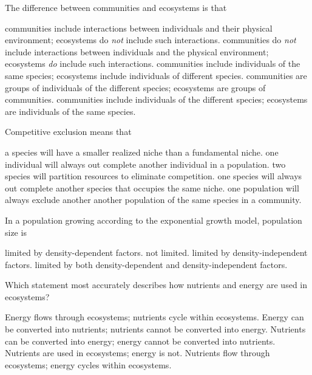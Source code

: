 \newpage

\question
The difference between communities and ecosystems is that

\begin{choices}
\choice communities include interactions between individuals and their physical environment; ecosystems do \emph{not} include such interactions.
\correctchoice communities do \emph{not} include interactions between individuals and the physical environment; ecosystems \emph{do} include such interactions.
\choice communities include individuals of the same species; ecosystems include individuals of different species.
\choice communities are groups of individuals of the different species; ecosystems are groups of communities.
\choice communities include individuals of the different species; ecosystems are individuals of the same species.
\end{choices}

\question
Competitive exclusion means that

\begin{choices}
\choice a species will have a smaller realized niche than a fundamental niche. 
\choice one individual will always out complete another individual in a population. 
\choice two species will partition resources to eliminate competition. 
\correctchoice one species will always out complete another species that occupies the same niche.  
\choice one population will always exclude another another population of the same species in a community. 
\end{choices}

\question
In a population growing according to the exponential growth model, population size is

\begin{choices}
\choice limited by density-dependent factors. 
\correctchoice not limited. 
\choice limited by density-independent factors. 
\choice limited by both density-dependent and density-independent factors. 
\end{choices}

\question
Which statement most accurately describes how nutrients and energy are used in ecosystems?

\begin{choices}
\correctchoice Energy flows through ecosystems; nutrients cycle within ecosystems. 
\choice Energy can be converted into nutrients; nutrients cannot be converted into energy. 
\choice Nutrients can be converted into energy; energy cannot be converted into nutrients. 
\choice Nutrients are used in ecosystems; energy is not. 
\choice Nutrients flow through ecosystems; energy cycles within ecosystems. 
\end{choices}

